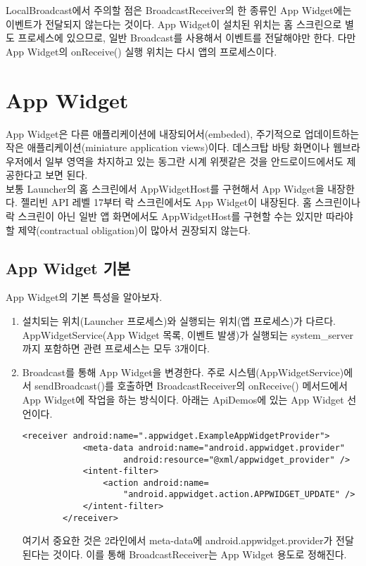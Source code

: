 LocalBroadcast에서 주의할 점은 BroadcastReceiver의 한 종류인 App Widget에는 이벤트가 전달되지 않는다는 것이다. App Widget이 설치된 위치는 홈 스크린으로 별도 프로세스에 있으므로, 일반 Broadcast를 사용해서 이벤트를 전달해야만 한다. 다만 App Widget의 onReceive() 실행 위치는 다시 앱의 프로세스이다.

\begin{comment}
별도 스레드내에서 sendBroadcastSync를 할 수 밖에 없다고 하면 onReceive 안에다가 UI를 건드리는 쪽에는 runOnUIThread 해도 되지만 참 번거로운 일이 되네요.

Activity의 runOnUIThread는 호출하는 곳이 uiThread가 아니면 역시 post를 해주고 있어요.
runOnUIThread는 해결책이라고 볼 수가 없네요.

\end{comment}

\section{App Widget}
App Widget은 다른 애플리케이션에 내장되어서(embeded), 주기적으로 업데이트하는 작은 애플리케이션(miniature application views)이다. 데스크탑 바탕 화면이나 웹브라우저에서 일부 영역을 차지하고 있는 동그란 시계 위젯같은 것을 안드로이드에서도 제공한다고 보면 된다.\\

보통 Launcher의 홈 스크린에서 AppWidgetHost를 구현해서 App Widget을 내장한다. 젤리빈 API 레벨 17부터 락 스크린에서도 App Widget이 내장된다. 홈 스크린이나 락 스크린이 아닌 일반 앱 화면에서도 AppWidgetHost를 구현할 수는 있지만 따라야 할 제약(contractual obligation)이 많아서 권장되지 않는다.

\subsection{App Widget 기본}
App Widget의 기본 특성을 알아보자.
\begin{enumerate}
\item 설치되는 위치(Launcher 프로세스)와 실행되는 위치(앱 프로세스)가 다르다. AppWidgetService(App Widget 목록, 이벤트 발생)가 실행되는 system\_server까지 포함하면 관련 프로세스는 모두 3개이다.

\item Broadcast를 통해 App Widget을 변경한다. 주로 시스템(AppWidgetService)에서 sendBroadcast()를 호출하면 BroadcastReceiver의 onReceive() 메서드에서 App Widget에 작업을 하는 방식이다.
아래는 ApiDemos에 있는 App Widget 선언이다.
\begin{lstlisting}[frame=single] 
        <receiver android:name=".appwidget.ExampleAppWidgetProvider">
            <meta-data android:name="android.appwidget.provider"
                    android:resource="@xml/appwidget_provider" />
            <intent-filter>
                <action android:name=
                	"android.appwidget.action.APPWIDGET_UPDATE" />
            </intent-filter>
        </receiver>
\end{lstlisting}
여기서 중요한 것은 2라인에서 meta-data에 android.appwidget.provider가 전달된다는 것이다. 이를 통해 BroadcastReceiver는 App Widget 용도로 정해진다.
\end{enumerate}

